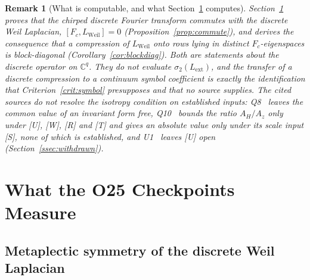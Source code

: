 \documentclass[11pt,a4paper]{article}
\newtheorem{remark}[theorem]{Remark}
\begin{document}
  \begin{remark}[What is computable, and what Section~\ref{sec:numerical} computes]
    \label{rem:compute}
    Section~\ref{sec:numerical} proves that the chirped discrete Fourier transform commutes with
    the discrete Weil Laplacian, $[F_c, L_{\mathrm{Weil}}] = 0$
    (Proposition~\ref{prop:commute}), and derives the consequence that a compression of
    $L_{\mathrm{Weil}}$ onto rows lying in distinct $F_c$-eigenspaces is block-diagonal
    (Corollary~\ref{cor:blockdiag}).
    Both are statements about the discrete operator on $\mathbb{C}^q$.
    They do not evaluate $\sigma_2(L_{\mathrm{ext}})$, and the transfer of a discrete compression
    to a continuum symbol coefficient is exactly the identification that Criterion~\ref{crit:symbol}
    presupposes and that no source supplies.
    The cited sources do not resolve the isotropy condition on established inputs:
    Q8~\cite{BeauQ8} leaves the common value of an invariant form free,
    Q10~\cite{Beau2026q10} bounds the ratio $A_H/A_z$ only under [U], [W], [R] and [T] and gives an
    absolute value only under its scale input [S], none of which is established, and
    U1~\cite{Beau2026u1} leaves [U] open (Section~\ref{ssec:withdrawn}).
  \end{remark}

  \section{What the O25 Checkpoints Measure}
  \label{sec:numerical}

  \subsection{Metaplectic symmetry of the discrete Weil Laplacian}
    \label{sec:metatplectic}
\end{document}
